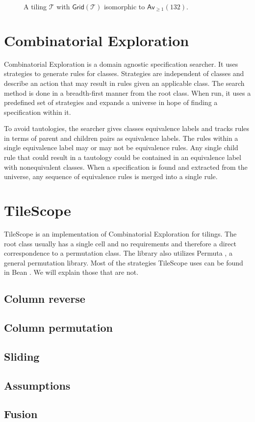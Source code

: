 \begin{figure}[ht!]
    \centering
    
    \caption{A tiling $\mathcal{T}$ with $\textsf{Grid}(\mathcal{T})$ isomorphic to $\textsf{Av}_{\geq1}(132)$.}
    \label{fig:tiling132}
\end{figure}

\section{Combinatorial Exploration}
Combinatorial Exploration \cite{css} is a domain agnostic specification searcher. It uses strategies to generate rules for classes. Strategies are independent of classes and describe an action that may result in rules given an applicable class. The search method is done in a breadth-first manner from the root class. When run, it uses a predefined set of strategies and expands a universe in hope of finding a specification within it.

To avoid tautologies, the searcher gives classes equivalence labels and tracks rules in terms of parent and children pairs as equivalence labels. The rules within a single equivalence label may or may not be equivalence rules. Any single child rule that could result in a tautology could be contained in an equivalence label with nonequivalent classes. When a specification is found and extracted from the universe, any sequence of equivalence rules is merged into a single rule.

\section{TileScope}
TileScope \cite{tiling} is an implementation of Combinatorial Exploration for tilings. The root class usually has a single cell and no requirements and therefore a direct correspondence to a permutation class. The library also utilizes Permuta \cite{permuta}, a general permutation library. Most of the strategies TileScope uses can be found in Bean \cite{BeanPhd:phd}. We will explain those that are not.

\subsection{Column reverse}

\subsection{Column permutation}

\subsection{Sliding}

\subsection{Assumptions}

\subsection{Fusion}
